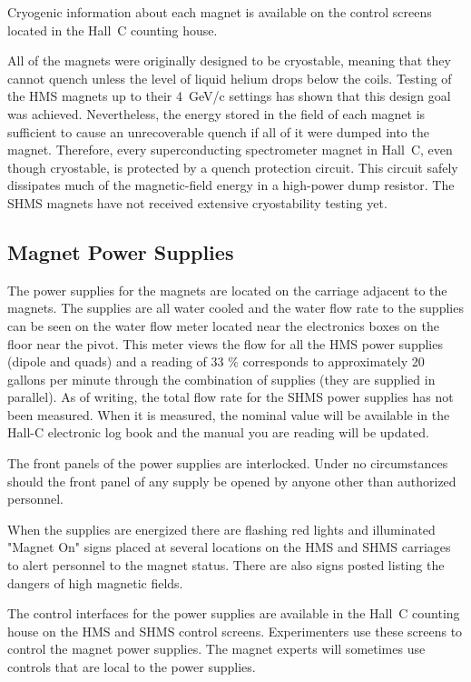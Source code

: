 {Cryogenic information about each magnet is available on the control
screens located in the Hall~C counting house.

All of the magnets were originally designed to be cryostable, meaning that they
cannot quench unless the level of liquid helium drops below the coils. Testing of
the HMS magnets up to their 4~GeV/c settings has shown that this design goal
was achieved. Nevertheless, the energy stored in the field of each magnet is sufficient 
to cause an unrecoverable quench if all of it were dumped into the magnet. 
Therefore, every superconducting spectrometer magnet in Hall~C, even though 
cryostable, is protected by a quench protection circuit. This circuit safely dissipates
much of the magnetic-field energy in a high-power dump resistor. The SHMS
magnets have not received extensive cryostability testing yet. 

\subsection {Magnet Power Supplies}

The power supplies for the magnets are located on the carriage
adjacent to the magnets. The supplies are all water cooled and
the water flow rate to the supplies can be seen on the water flow
meter located near the electronics boxes on the floor near the pivot.
This meter views the flow for all the HMS power supplies
(dipole and quads) and a reading of 33 $\%$ corresponds to approximately
20 gallons per minute through the combination of supplies (they are supplied
in parallel).
As of writing, the total flow rate for the SHMS power supplies has not been 
measured. When it is measured, the nominal value will be available in the Hall-C electronic log book
and the manual you are reading will be updated. 

The front panels of the power supplies are interlocked. Under
no circumstances should the front panel of any supply be opened by anyone other
than authorized personnel.

When the supplies are energized there are flashing red lights  and 
illuminated "Magnet On" signs placed at
several locations on the HMS and SHMS carriages to alert personnel to the magnet
status. There are also signs posted listing the dangers of high magnetic
fields.

The control interfaces for the power supplies are available in the 
Hall~C counting house on the HMS and SHMS control screens. Experimenters
use these screens to control the magnet power supplies. The magnet experts
will sometimes use controls that are local to the power supplies.

}
